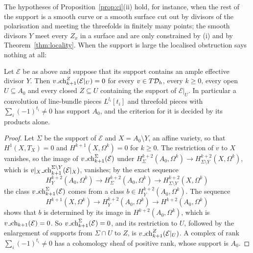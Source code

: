 The hypotheses of Proposition~\ref{prop:ci}(ii) hold, for instance, when the rest of the support is a smooth curve or a smooth surface cut out by divisors of the polarisation and meeting the threefolds in finitely many points; the smooth divisors $Y$ meet every $Z_{x}$ in a surface and are only constrained by (i) and by Theorem~\ref{thm:locality}. When the support is large the localised obstruction says nothing at all:

\begin{proposition}\label{prop:stops}
Let $\mathcal{E}$ be as above and suppose that its support contains an ample effective divisor $Y$. Then $v\lrcorner\mathrm{ch}^{Z}_{k+1}(\mathcal{E}|_{U})=0$ for every $v\in T\mathcal{D}_{h}$, every $k\ge0$, every open $U\subseteq A_{0}$ and every closed $Z\subseteq U$ containing the support of $\mathcal{E}|_{U}$. In particular a convolution of line-bundle pieces $L^{l_{i}}[t_{i}]$ and threefold pieces with $\sum_{i}(-1)^{t_{i}}\ne0$ has support $A_{0}$, and the criterion for it is decided by its products alone.
\end{proposition}

\begin{proof}
Let $\Sigma$ be the support of $\mathcal{E}$ and $X=A_{0}\setminus Y$, an affine variety, so that $H^{1}(X,T_{X})=0$ and $H^{k+1}(X,\Omega^{k})=0$ for $k\ge0$. The restriction of $v$ to $X$ vanishes, so the image of $v\lrcorner\mathrm{ch}^{\Sigma}_{k+1}(\mathcal{E})$ under $H^{k+2}_{\Sigma}(A_{0},\Omega^{k})\to H^{k+2}_{\Sigma\setminus Y}(X,\Omega^{k})$, which is $v|_{X}\lrcorner\mathrm{ch}^{\Sigma\setminus Y}_{k+1}(\mathcal{E}|_{X})$, vanishes; by the exact sequence
\[
H^{k+2}_{Y}(A_{0},\Omega^{k})\to H^{k+2}_{\Sigma}(A_{0},\Omega^{k})\to H^{k+2}_{\Sigma\setminus Y}(X,\Omega^{k})
\]
the class $v\lrcorner\mathrm{ch}^{\Sigma}_{k+1}(\mathcal{E})$ comes from a class $b\in H^{k+2}_{Y}(A_{0},\Omega^{k})$. The sequence
\[
H^{k+1}(X,\Omega^{k})\to H^{k+2}_{Y}(A_{0},\Omega^{k})\to H^{k+2}(A_{0},\Omega^{k})
\]
shows that $b$ is determined by its image in $H^{k+2}(A_{0},\Omega^{k})$, which is $v\lrcorner\mathrm{ch}_{k+1}(\mathcal{E})=0$. So $v\lrcorner\mathrm{ch}^{\Sigma}_{k+1}(\mathcal{E})=0$, and its restriction to $U$, followed by the enlargement of supports from $\Sigma\cap U$ to $Z$, is $v\lrcorner\mathrm{ch}^{Z}_{k+1}(\mathcal{E}|_{U})$. A complex of rank $\sum_{i}(-1)^{t_{i}}\ne0$ has a cohomology sheaf of positive rank, whose support is $A_{0}$.
\end{proof}


